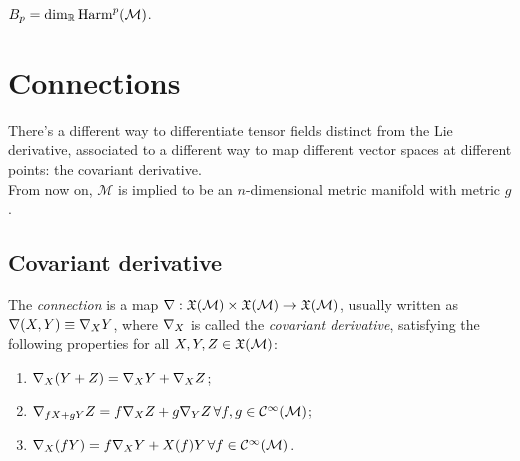 \begin{corollary}
  $ B_p = \dim_{\mathbb{R}} \mathrm{Harm}^{p}(\mathcal{M}) $.
\end{corollary}

\section{Connections}

There's a different way to differentiate tensor fields distinct from the Lie derivative, associated to a different way to map different vector spaces at different points: the covariant derivative.\\
From now on, $ \mathcal{M} $ is implied to be an $ n $-dimensional metric manifold with metric $ g $.

\subsection{Covariant derivative}

\begin{definition}
  The \textit{connection} is a map $ \nabla : \mathfrak{X}(\mathcal{M}) \times \mathfrak{X}(\mathcal{M}) \rightarrow \mathfrak{X}(\mathcal{M}) $, usually written as $ \nabla(X,Y) \equiv \nabla_X Y $, where $ \nabla_X $ is called the \textit{covariant derivative}, satisfying the following properties for all $ X,Y,Z \in \mathfrak{X}(\mathcal{M}) $:
  \begin{enumerate}
    \item $ \nabla_X (Y + Z) = \nabla_X Y + \nabla_X Z $;
    \item $ \nabla_{fX + gY} Z = f \nabla_X Z + g \nabla_Y Z \,\forall f,g \in \mathcal{C}^{\infty}(\mathcal{M}) $;
    \item $ \nabla_X (fY) = f \nabla_X Y + X(f) Y \,\forall f \in \mathcal{C}^{\infty}(\mathcal{M}) $.
  \end{enumerate}
\end{definition}

